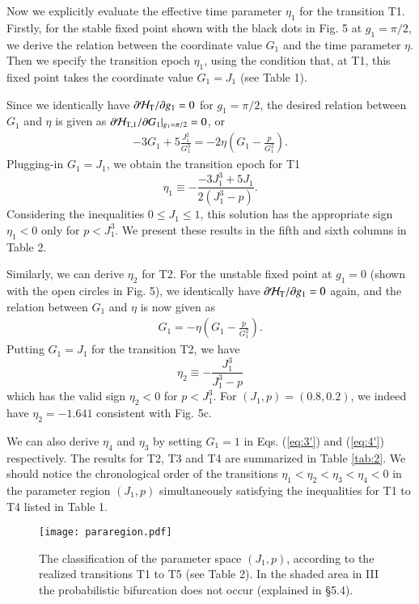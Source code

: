 \documentclass[useAMS,usenatbib,twocolumn]{mn2e}
\newcommand{\beq}{\begin{equation}}
\newcommand{\beqa}{\begin{eqnarray}}
\newcommand{\eeq}{\end{equation}}
\newcommand{\eeqa}{\end{eqnarray}}
\newcommand{\lmk}{\left(}
\newcommand{\rmk}{\right)}
\newcommand{\III}{{I\hspace{-.1em}I\hspace{-.1em}I}}
\begin{document}
Now we explicitly evaluate the effective time parameter $\eta _1 $ for the transition T1. Firstly, for the stable fixed point shown with the black dots in Fig. 5 at  $g_1=\pi/2$,  we  derive the relation between the  coordinate value $G_1$ and the time parameter $\eta$.  Then we specify the transition epoch $\eta_1$,  using the condition that, at T1, this fixed point takes the coordinate value  $G_1=J_1$ (see Table 1).  


Since we identically have $\partial \mathcal{H}_{\rm T}/\partial
g_{1}=0$ for $g_1=\pi/2$, the desired relation between $G_1$ and $\eta$  is given as $\partial \mathcal{H}_{\rm T,1}/\partial G_1|_{g_1=\pi/2}=0$, or 
\beqa
-3G_1+5\frac{J_{1}^{2}}{G_{1}^3}=-2\eta\lmk G_1-\frac{p}{G_{1}^{2}}\rmk.
\label{eq:3'}
\eeqa
Plugging-in $G_1=J_1$, we obtain the transition epoch for T1 
\beq
\eta_1\equiv-\frac{-3J_{1}^3+5J_{1}}{2(J_{1}^3-p)}.
\eeq
Considering the inequalities $0\le J_1\le 1$,  this solution has the appropriate sign $\eta_1<0$ only for $p<J_1^3$. We present these results in the fifth and sixth columns in Table 2. 

Similarly, we can derive $\eta_2$ for T2. For the unstable fixed point at $g_1=0$ (shown with the open circles in Fig. 5), we  identically have  $\partial \mathcal{H}_{\rm T}/\partial
g_{1}=0$ again, and the relation between $G_1$ and $\eta$ is now given as 
\beqa
G_1=-\eta\lmk G_1-\frac{p}{G_{1}^{2}}\rmk.
\label{eq:4'}
\eeqa
Putting $G_{1}=J_1$ for the transition T2, we have 
\beq
\eta_2\equiv-\frac{J_{1}^3}{J_{1}^3-p}
\eeq
which has the valid sign $\eta_2<0$ for $p<J_1^3$. 
For $(J_1,p)=(0.8,0.2)$, we indeed have $\eta_2=-1.641$ consistent with Fig. 5c.


We can also derive $\eta_4$ and $\eta_3$ by setting $G_1=1$ in Eqs. (\ref{eq:3'}) and  (\ref{eq:4'}) respectively.
The results for T2, T3 and T4  are  summarized in Table \ref{tab:2}.
We should  notice the chronological order of the transitions
$\eta_1<\eta_2<\eta_3<\eta_4<0$ in the parameter region $(J_1,p)$ simultaneously satisfying the inequalities for T1 to T4 listed in Table 1. 






\begin{figure}
\begin{center}
\texttt{[image: pararegion.pdf]}
\caption{The classification of the parameter space
$(J_1,p)$, according to the realized transitions T1 to T5 (see Table 2). In the shaded
area in  \III\, the probabilistic bifurcation does not occur
(explained in  \S 5.4).}
\label{fig:pj}
\end{center}
\end{figure}
\end{document}
